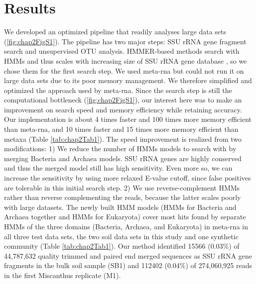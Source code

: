 \documentclass[]{msu-thesis}
\begin{document}
\section{Results}

We developed an optimized pipeline that readily analyses large data sets (\cref{fig:chap2FigS1}). The pipeline has two major steps: SSU rRNA gene fragment search and unsupervised OTU analysis. HMMER-based methods search with HMMs and thus scales with increasing size of SSU rRNA gene database \cite{cole_ribosomal_2014}, so we chose them for the first search step. We used meta-rna \cite{huang_identification_2009} but could not run it on large data sets due to its poor memory management. We therefore simplified and optimized the approach used by meta-rna. Since the search step is still the computational bottleneck (\cref{fig:chap2FigS1}), our interest here was to make an improvement on search speed and memory efficiency while retaining accuracy. Our implementation is about 4 times faster and 100 times more memory efficient than meta-rna, and 10 times faster and 15 times more memory efficient than metaxa \cite{bengtsson_metaxa:_2011} (Table \ref{tab:chap2Tab1}). The speed improvement is realized from two modifications: 1) We reduce the number of HMMs models to search with by merging Bacteria and Archaea models. SSU rRNA genes are highly conserved and thus the merged model still has high sensitivity. Even more so, we can increase the sensitivity by using more relaxed E-value cutoff, since false positives are tolerable in this initial search step. 2) We use reverse-complement HMMs rather than reverse complementing the reads, because the latter scales poorly with large datasets. The newly built HMM models (HMMs for Bacteria and Archaea together and HMMs for Eukaryota) cover most hits found by separate HMMs of the three domains (Bacteria, Archaea, and Eukaryota) in meta-rna in all three test data sets, the two soil data sets in this study and one synthetic community (Table \ref{tab:chap2Tab1}). Our method identified 15566 (0.03\%) of 44,787,632 quality trimmed and paired end merged sequences as SSU rRNA gene fragments in the bulk soil sample (SB1) and 112402 (0.04\%) of 274,060,925 reads in the first Miscanthus replicate (M1).
\end{document}
